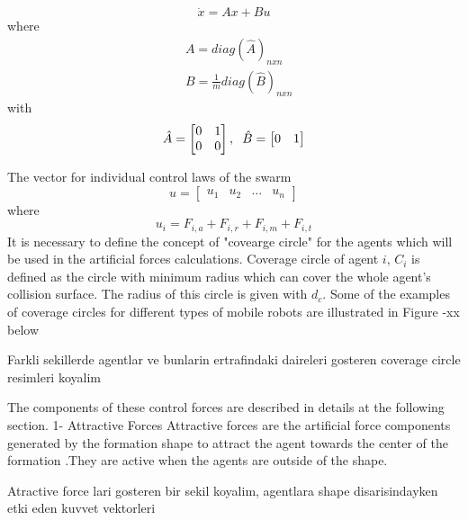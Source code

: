 \documentclass[twoside]{article}
\begin{document}
\begin{multicols}{2}
			\begin{equation}
\dot{x} = Ax + Bu
			\end{equation}
			where
			\begin{align*}
&A = diag\left(\hat{A}\right)_{nxn}\\
&B = \frac{1}{m} diag\left(\hat{B}\right)_{nxn}
			\end{align*}
			with
			\begin{equation}
\hat{A} = \begin{bmatrix}
0&1\\0&0
\end{bmatrix} , \hspace{0.2cm} \hat{B} = \begin{bmatrix}
0&1
\end{bmatrix}
			\end{equation}
			
			The vector for individual control laws of the swarm
			\begin{equation}
u = \begin{bmatrix}
u_1 & u_2 & ... & u_n
\end{bmatrix}
			\end{equation}
			where
			\begin{equation}
u_i = F_{i,a} + F_{i,r} + F_{i,m} + F_{i,t}
			\end{equation}
		It is necessary to define the concept of "covearge circle"	for the agents which will be used in the artificial forces calculations. Coverage circle of agent $i$, $C_i$ is defined as the circle with minimum radius which can cover the whole agent's collision surface. The radius of this circle is given with $d_c$. Some of the examples of coverage circles for different types of mobile robots are illustrated in Figure -xx below
		
		Farkli sekillerde agentlar ve bunlarin ertrafindaki daireleri gosteren coverage circle resimleri koyalim
		
		
		The components of these  control forces are described in details at the following section.
			1- Attractive Forces
			Attractive forces are the artificial force components generated by the formation shape to attract the agent towards the center of the formation .They are active when the agents are outside of the shape. 
			
			Atractive force lari gosteren bir sekil koyalim, agentlara shape disarisindayken etki eden kuvvet vektorleri


\end{multicols}
\end{document}
